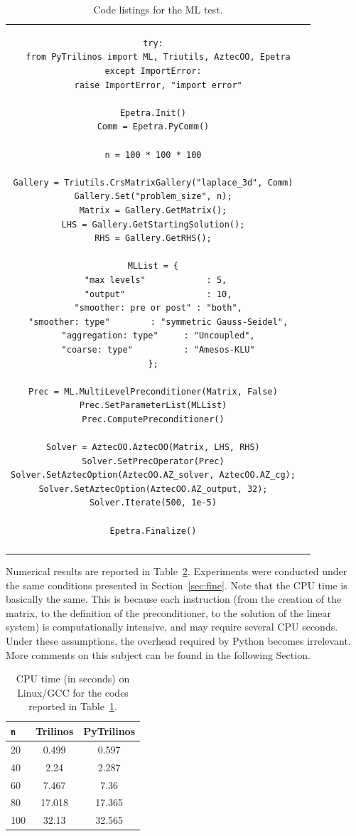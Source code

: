 \documentclass[10pt,relax]{SANDreport}
\begin{document}
\begin{table}
\begin{tabular}{| c  | c|}
\begin{minipage}{10.5cm}
\begin{verbatim}
try:
  from PyTrilinos import ML, Triutils, AztecOO, Epetra
except ImportError:
  raise ImportError, "import error"

Epetra.Init()
Comm = Epetra.PyComm()

n = 100 * 100 * 100

Gallery = Triutils.CrsMatrixGallery("laplace_3d", Comm)
Gallery.Set("problem_size", n);
Matrix = Gallery.GetMatrix();
LHS = Gallery.GetStartingSolution();
RHS = Gallery.GetRHS();

MLList = {
  "max levels"            : 5, 
  "output"                : 10,
  "smoother: pre or post" : "both",
  "smoother: type"        : "symmetric Gauss-Seidel",
  "aggregation: type"     : "Uncoupled",
  "coarse: type"          : "Amesos-KLU"
};

Prec = ML.MultiLevelPreconditioner(Matrix, False)
Prec.SetParameterList(MLList)
Prec.ComputePreconditioner()

Solver = AztecOO.AztecOO(Matrix, LHS, RHS)
Solver.SetPrecOperator(Prec)
Solver.SetAztecOption(AztecOO.AZ_solver, AztecOO.AZ_cg);
Solver.SetAztecOption(AztecOO.AZ_output, 32);
Solver.Iterate(500, 1e-5)

Epetra.Finalize()
\end{verbatim}
\end{minipage}
\\
&  \\
\hline
\end{tabular}
\caption{Code listings for the ML test.}
\label{tab:code_ml}
\end{table}

Numerical results are reported in Table~\ref{tab:time_ml}. Experiments were
conducted under the same conditions presented in Section~\ref{sec:fine}. Note
that the CPU time is basically the same. This is because each instruction
(from the creation of the matrix, to the definition of the preconditioner, to
 the solution of the linear system) is computationally intensive, and may
require several CPU seconds. Under these assumptions, the overhead required by
Python becomes irrelevant. More comments on this subject can be found in the
following Section.

\begin{table}
\begin{center}
\begin{tabular}{| l | c | c |}
\hline
\tt n & Trilinos & PyTrilinos \\
\hline
20  & 0.499  & 0.597 \\
40  & 2.24   & 2.287 \\
60  & 7.467  & 7.36 \\
80  & 17.018 & 17.365 \\
100 & 32.13  & 32.565 \\
\hline
\end{tabular}
\caption{CPU time (in seconds) on Linux/GCC for the codes reported in
Table~\ref{tab:code_ml}.}
\label{tab:time_ml}
\end{center}
\end{table}
\end{document}
